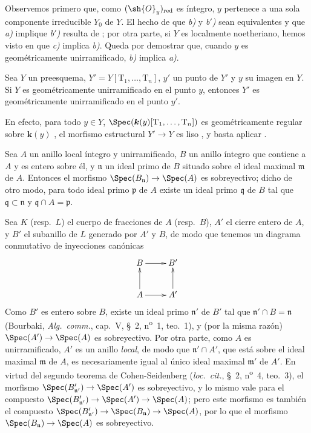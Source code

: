 Observemos primero que, como $(\sh{O}_y)_{\mathrm{red}}$ es íntegro, $y$ pertenece a una sola componente irreducible $Y_0$ de $Y$.
El hecho de que \emph{b)} y \emph{b$'$)} sean equivalentes y que \emph{a)} implique \emph{b$'$)} resulta de ; por otra parte, si $Y$ es localmente noetheriano, hemos visto en  que \emph{c)} implica \emph{b)}.
Queda por demostrar que, cuando $y$ es geométricamente unirramificado, \emph{b)} implica \emph{a)}.

\begin{lemma}[14.4.1.1]
\label{IV.14.4.1.1}
Sea $Y$ un preesquema, $Y'=Y[\mathrm{T}_1,\ldots,\mathrm{T}_n]$, $y'$ un punto de $Y'$ y $y$ su imagen en $Y$.
Si $Y$ es geométricamente unirramificado en el punto $y$, entonces $Y'$ es geométricamente unirramificado en el punto $y'$.
\end{lemma}

En efecto, para todo $y\in Y$, $\Spec(\boldsymbol{k}(y)[\mathrm{T}_1,\ldots,\mathrm{T}_n])$ es geométricamente regular sobre $\boldsymbol{k}(y)$ , el morfismo estructural $Y'\to Y$ es liso , y basta aplicar .

\begin{lemma}[14.4.1.2]
\label{IV.14.4.1.2}
Sea $A$ un anillo local íntegro y \textup{unirramificado}, $B$ un anillo íntegro que contiene a $A$ y es entero sobre él, y $\mathfrak{n}$ un ideal primo de $B$ situado sobre el ideal maximal $\mathfrak{m}$ de $A$.
Entonces el morfismo $\Spec(B_\mathfrak{n})\to\Spec(A)$ es sobreyectivo; dicho de otro modo, para todo ideal primo $\mathfrak{p}$ de $A$ existe un ideal primo $\mathfrak{q}$ de $B$ tal que $\mathfrak{q}\subset\mathfrak{n}$ y $\mathfrak{q}\cap A=\mathfrak{p}$.
\end{lemma}

Sea $K$ (resp.\ $L$) el cuerpo de fracciones de $A$ (resp.\ $B$), $A'$ el cierre entero de $A$, y $B'$ el subanillo de $L$ generado por $A'$ y $B$, de modo que tenemos un diagrama conmutativo de inyecciones canónicas
\[
  \xymatrix{
    B \ar[r] & B' \\
    A \ar[u] \ar[r] & A' \ar[u]
  }
\]
Como $B'$ es entero sobre $B$, existe un ideal primo $\mathfrak{n}'$ de $B'$ tal que $\mathfrak{n}'\cap B=\mathfrak{n}$ (Bourbaki, \emph{Alg.\ comm.}, cap.~V, \S~2, n\textsuperscript{o}~1, teo.~1), y (por la misma razón) $\Spec(A')\to\Spec(A)$ es sobreyectivo.
Por otra parte, como $A$ es unirramificado, $A'$ es un anillo \emph{local}, de modo que $\mathfrak{n}'\cap A'$, que está sobre el ideal maximal $\mathfrak{m}$ de $A$, es necesariamente igual al único ideal maximal $\mathfrak{m}'$ de $A'$.
En virtud del segundo teorema de Cohen-Seidenberg (\emph{loc.\ cit.}, \S~2, n\textsuperscript{o}~4, teo.~3), el morfismo $\Spec(B'_{\mathfrak{n}'})\to\Spec(A')$ es sobreyectivo, y lo mismo vale para el compuesto $\Spec(B'_{\mathfrak{n}'})\to\Spec(A')\to\Spec(A)$; pero este morfismo es también el compuesto $\Spec(B'_{\mathfrak{n}'})\to\Spec(B_\mathfrak{n})\to\Spec(A)$, por lo que el morfismo $\Spec(B_\mathfrak{n})\to\Spec(A)$ es sobreyectivo.

